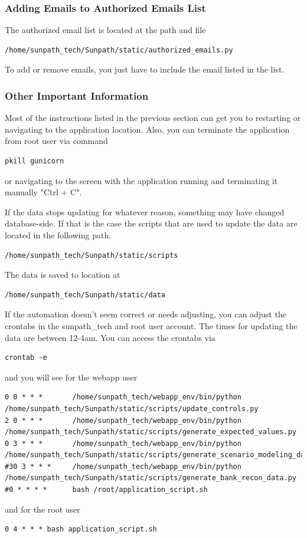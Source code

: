 \documentclass[titlepage]{article}
\begin{document}
\subsubsection{Adding Emails to Authorized Emails List}
The authorized email list is located at the path and file
\begin{verbatim}
/home/sunpath_tech/Sunpath/static/authorized_emails.py
\end{verbatim}
To add or remove emails, you just have to include the email listed in the list. 

\subsubsection{Other Important Information}
Most of the instructions listed in the previous section can get you to restarting or navigating to the application location. Also, you can terminate the application from root user via command 
\begin{verbatim}
pkill gunicorn
\end{verbatim}
or navigating to the screen with the application running and terminating it manually "Ctrl + C". 

If the data stops updating for whatever reason, something may have changed database-side. If that is the case the scripts that are used to update the data are located in the following path.
\begin{verbatim}
/home/sunpath_tech/Sunpath/static/scripts
\end{verbatim}
The data is saved to location at 
\begin{verbatim}
/home/sunpath_tech/Sunpath/static/data
\end{verbatim}

If the automation doesn't seem correct or needs adjusting, you can adjust the crontabs in the sunpath\_tech and root user account. The times for updating the data are between 12-4am. You can access the crontabs via 
\begin{verbatim}
crontab -e
\end{verbatim}
and you will see for the webapp user
\begin{verbatim}
0 0 * * *       /home/sunpath_tech/webapp_env/bin/python 
/home/sunpath_tech/Sunpath/static/scripts/update_controls.py
2 0 * * *       /home/sunpath_tech/webapp_env/bin/python 
/home/sunpath_tech/Sunpath/static/scripts/generate_expected_values.py
0 3 * * *       /home/sunpath_tech/webapp_env/bin/python 
/home/sunpath_tech/Sunpath/static/scripts/generate_scenario_modeling_data.py
#30 3 * * *     /home/sunpath_tech/webapp_env/bin/python 
/home/sunpath_tech/Sunpath/static/scripts/generate_bank_recon_data.py
#0 * * * *      bash /root/application_script.sh 
\end{verbatim}
and for the root user
\begin{verbatim}
0 4 * * * bash application_script.sh
\end{verbatim}
\end{document}
